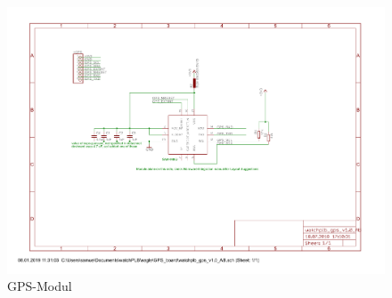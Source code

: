 \documentclass[a4paper]{scrartcl}
\begin{document}
\begin{figure}[H]\centering
\includegraphics[page=1, angle=90, width=\linewidth]{../eagle/GPS_board/watchplb_gps_v1_0_AB.pdf}
\caption{GPS-Modul}
\end{figure}
\end{document}
